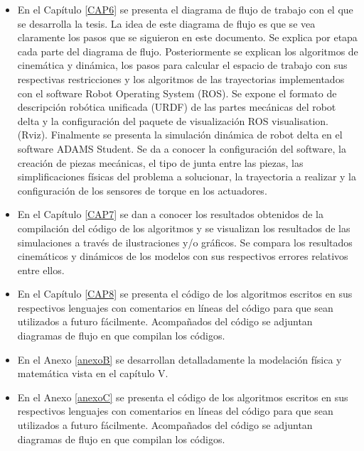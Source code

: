\begin{itemize}
    \item {En el Capítulo \ref{CAP6} se presenta el diagrama de flujo de trabajo con el que se desarrolla la tesis. La idea de este diagrama de flujo es que se vea claramente los pasos que se siguieron en este documento. Se explica por etapa cada parte del diagrama de flujo. Posteriormente se explican los algoritmos de cinemática y dinámica, los pasos para calcular el espacio de trabajo con sus respectivas restricciones y los algoritmos de las trayectorias implementados con el software Robot Operating System (ROS). Se expone el formato de descripción robótica unificada (URDF) de las partes mecánicas del robot delta y la configuración del paquete de visualización ROS visualisation. (Rviz). Finalmente se presenta la simulación dinámica de robot delta en el software ADAMS Student. Se da a conocer la configuración del software, la creación de piezas mecánicas, el tipo de junta entre las piezas, las simplificaciones físicas del problema a solucionar, la trayectoria a realizar y la configuración de los sensores de torque en los actuadores.}
    \item {En el Capítulo \ref{CAP7} se dan a conocer los resultados obtenidos de la compilación del código de los algoritmos y se visualizan los resultados de las simulaciones a través de ilustraciones y/o gráficos. Se compara los resultados cinemáticos y dinámicos de los modelos con sus respectivos errores relativos entre ellos.  }
    \item {En el Capítulo \ref{CAP8} se presenta el código de los algoritmos escritos en sus respectivos lenguajes con comentarios en líneas del código para que sean utilizados a futuro fácilmente. Acompañados del código se adjuntan diagramas de flujo en que compilan los códigos.}
    \item {En el Anexo \ref{anexoB} se desarrollan detalladamente la modelación física y matemática vista en el capítulo V.} 
    \item {En el Anexo \ref{anexoC} se presenta el código de los algoritmos escritos en sus respectivos lenguajes con comentarios en líneas del código para que sean utilizados a futuro fácilmente. Acompañados del código se adjuntan diagramas de flujo en que compilan los códigos.} 
    \end{itemize}